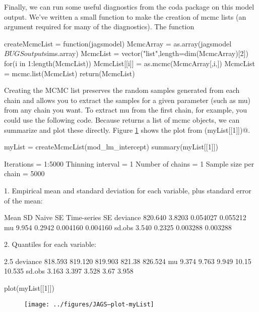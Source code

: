 Finally, we can run some useful diagnostics from the coda package on this model output. We've written a small function to make the creation of mcmc lists (an argument required for many of the diagnostics). The function 

\begin{Schunk}
\begin{Sinput}
 createMcmcList = function(jagsmodel) {
 McmcArray = as.array(jagsmodel$BUGSoutput$sims.array)
 McmcList = vector("list",length=dim(McmcArray)[2])
 for(i in 1:length(McmcList)) McmcList[[i]] = as.mcmc(McmcArray[,i,])
 McmcList = mcmc.list(McmcList)
 return(McmcList)
 }
\end{Sinput}
\end{Schunk}

Creating the  MCMC list preserves the random samples generated from each chain and allows you to extract the samples for a given parameter (such as mu) from any chain you want. To extract mu from the first chain, for example, you could use the following code. Because \verb@createMcmcList@ returns a list of mcmc objects, we can summarize and plot these directly. Figure \ref{fig:myList} shows the plot from \verb@plot(myList[[1]])@.

\begin{Schunk}
\begin{Sinput}
 myList = createMcmcList(mod_lm_intercept)
 summary(myList[[1]])
\end{Sinput}
\begin{Soutput}
Iterations = 1:5000
Thinning interval = 1 
Number of chains = 1 
Sample size per chain = 5000 

1. Empirical mean and standard deviation for each variable,
   plus standard error of the mean:

            Mean     SD Naive SE Time-series SE
deviance 820.640 3.8203 0.054027       0.055212
mu         9.954 0.2942 0.004160       0.004160
sd.obs     3.540 0.2325 0.003288       0.003288

2. Quantiles for each variable:

            2.5%     25%     50%    75%   97.5%
deviance 818.593 819.120 819.903 821.38 826.524
mu         9.374   9.763   9.949  10.15  10.535
sd.obs     3.163   3.397   3.528   3.67   3.958
\end{Soutput}
\begin{Sinput}
 plot(myList[[1]])
\end{Sinput}
\end{Schunk}
\begin{figure}[htp]
\begin{center}
\texttt{[image: ../figures/JAGS--plot-myList]}
\end{center}
\caption{}
\label{fig:myList}
\end{figure}


